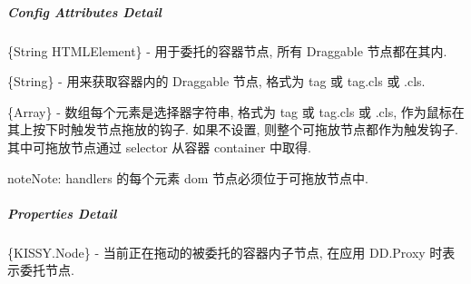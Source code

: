 \documentclass[letterpaper,10pt,english]{sphinxmanual}
\begin{document}
\subparagraph{Config Attributes Detail}
\label{api/component/dd/draggable-delegate:config-attributes-detail}

\begin{fulllineitems}
\label{api/component/dd/draggable-delegate:DraggableDelegate.container}
\{String \textbar{} HTMLElement\} - 用于委托的容器节点, 所有 Draggable 节点都在其内.

\end{fulllineitems}



\begin{fulllineitems}
\label{api/component/dd/draggable-delegate:DraggableDelegate.selector}
\{String\} - 用来获取容器内的 Draggable 节点, 格式为 tag 或 tag.cls 或 .cls.

\end{fulllineitems}



\begin{fulllineitems}
\label{api/component/dd/draggable-delegate:DraggableDelegate.handlers}
\{Array\} - 数组每个元素是选择器字符串, 格式为 tag 或 tag.cls 或 .cls, 作为鼠标在其上按下时触发节点拖放的钩子.  如果不设置, 则整个可拖放节点都作为触发钩子.  其中可拖放节点通过 selector 从容器 container 中取得.

\begin{notice}{note}{Note:}
handlers 的每个元素 dom 节点必须位于可拖放节点中.
\end{notice}

\end{fulllineitems}



\subparagraph{Properties Detail}
\label{api/component/dd/draggable-delegate:properties-detail}

\begin{fulllineitems}
\label{api/component/dd/draggable-delegate:DraggableDelegate.node}
\{KISSY.Node\} - 当前正在拖动的被委托的容器内子节点, 在应用 DD.Proxy 时表示委托节点.

\end{fulllineitems}
\end{document}
